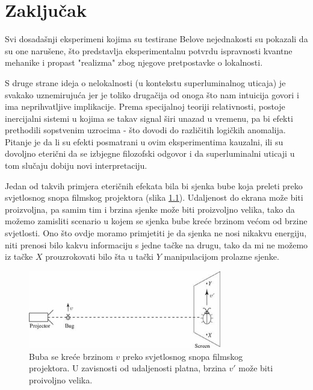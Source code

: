 \chapter{Zaključak}

Svi dosadašnji eksperimeni kojima su testirane Belove nejednakosti su pokazali da su one narušene, što predstavlja eksperimentalnu potvrdu ispravnosti kvantne mehanike i propast "realizma" zbog njegove pretpostavke o lokalnosti.

S druge strane ideja o nelokalnosti (u kontekstu superluminalnog uticaja) je svakako uznemiruju\' ca jer je toliko druga\v cija od onoga \v sto nam intuicija govori i ima nepri\-hvatljive implikacije.
Prema specijalnoj teoriji relativnosti, postoje inercijalni sistemi u kojima se takav signal \v siri unazad u vremenu, pa bi efekti prethodili sopstvenim uzrocima - \v sto dovodi do
razli\v citih logi\v ckih anomalija.
Pitanje je da li su efekti posmatrani u ovim eksperimentima kauzalni, ili su dovoljno eteri\v cni da se izbjegne filozofski odgovor i da superluminalni uticaji u tom slu\v caju
dobiju novi interpretaciju.

Jedan od takvih primjera eteri\v cnih efekata bila bi sjenka bube koja preleti preko svjetlosnog snopa filmskog projektora (slika \ref{fig:bug_on_screen}). Udaljenost do ekrana mo\v ze biti proizvoljna, pa samim tim i brzina sjenke
mo\v ze biti proizvoljno velika, tako da mo\v zemo zamisliti scenario u kojem se sjenka bube kre\' ce brzinom ve\' com od brzine svjetlosti.
Ono \v sto ovdje moramo primjetiti je da sjenka ne nosi nikakvu energiju, niti prenosi bilo kakvu informaciju s jedne ta\v cke na drugu, tako da mi ne mo\v zemo iz ta\v cke $X$ prouzrokovati bilo
\v sta u ta\v cki $Y$ manipulacijom prolazne sjenke.

\begin{figure}[H]
    \centering
    \includegraphics[width=0.75\textwidth]{figures/bug_on_screen.eps}
    \caption{Buba se kre\' ce brzinom $v$ preko svjetlosnog snopa filmskog projektora. U zavisnosti od udaljenosti platna, brzina $v'$ mo\v ze biti proivoljno velika.}
    \label{fig:bug_on_screen}
\end{figure}

